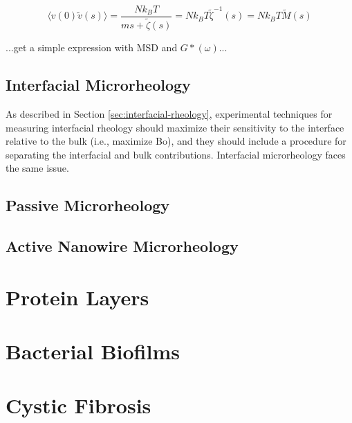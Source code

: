 \begin{equation}
  \langle v(0)\tilde{v}(s) \rangle = \frac{Nk_B T}{ms + \tilde{\zeta}(s)} = Nk_B T \tilde{\zeta}^{-1}(s) = Nk_B T \tilde{M}(s)
\end{equation}

...get a simple expression with MSD and $G*(\omega)$...

\subsection{Interfacial Microrheology}

As described in Section \ref{sec:interfacial-rheology}, experimental techniques for measuring interfacial rheology should maximize their sensitivity to the interface relative to the bulk (i.e., maximize Bo), and they should include a procedure for separating the interfacial and bulk contributions. Interfacial microrheology faces the same issue.

\subsection{Passive Microrheology}


\subsection{Active Nanowire Microrheology}


\section{Protein Layers}
\section{Bacterial Biofilms}
\section{Cystic Fibrosis}